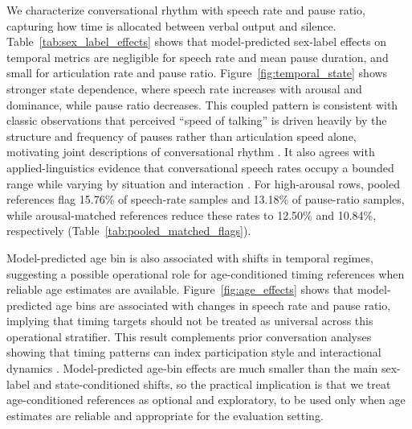 \documentclass[conference]{IEEEtran}
\begin{document}
We characterize conversational rhythm with speech rate and pause ratio, capturing how time is allocated between verbal output and silence.
Table~\ref{tab:sex_label_effects} shows that model-predicted sex-label effects on temporal metrics are negligible for speech rate and mean pause duration, and small for articulation rate and pause ratio.
Figure~\ref{fig:temporal_state} shows stronger state dependence, where speech rate increases with arousal and dominance, while pause ratio decreases. 
This coupled pattern is consistent with classic observations that perceived ``speed of talking'' is driven heavily by the structure and frequency of pauses rather than articulation speed alone, motivating joint descriptions of conversational rhythm \cite{goldman1958speech, goldman1961significance}.
It also agrees with applied-linguistics evidence that conversational speech rates occupy a bounded range while varying by situation and interaction \cite{tauroza_speech_1990, nishizawa2024authenticity}.
For high-arousal rows, pooled references flag 15.76\% of speech-rate samples and 13.18\% of pause-ratio samples, while arousal-matched references reduce these rates to 12.50\% and 10.84\%, respectively (Table~\ref{tab:pooled_matched_flags}).

Model-predicted age bin is also associated with shifts in temporal regimes, suggesting a possible operational role for age-conditioned timing references when reliable age estimates are available. 
Figure~\ref{fig:age_effects} shows that model-predicted age bins are associated with changes in speech rate and pause ratio, implying that timing targets should not be treated as universal across this operational stratifier. 
This result complements prior conversation analyses showing that timing patterns can index participation style and interactional dynamics \cite{campbell2008individual}. 
Model-predicted age-bin effects are much smaller than the main sex-label and state-conditioned shifts, so the practical implication is that we treat age-conditioned references as optional and exploratory, to be used only when age estimates are reliable and appropriate for the evaluation setting.
\end{document}
